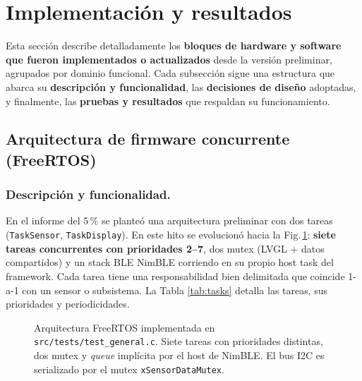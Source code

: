 \documentclass[letterpaper,11pt]{article}
\newcommand{\rfigura}[1]{Fig.\,\ref{#1}}
\newcommand{\rtabla}[1]{Tabla \ref{#1}}
\begin{document}
\section{Implementación y resultados}
\label{sec:impl}
Esta sección describe detalladamente los \textbf{bloques de hardware y software
que fueron implementados o actualizados} desde la versión preliminar, agrupados por dominio
funcional. Cada subsección sigue una estructura que abarca su \textbf{descripción y funcionalidad},
las \textbf{decisiones de diseño} adoptadas, y finalmente, las \textbf{pruebas y
resultados} que respaldan su funcionamiento.

\subsection{Arquitectura de firmware concurrente (FreeRTOS)}
\subsubsection{Descripción y funcionalidad.} En el informe del 5\,\% se planteó una arquitectura
preliminar con dos tareas (\texttt{TaskSensor}, \texttt{TaskDisplay}). En este hito se evolucionó
hacia la \rfigura{fig:rtos}: \textbf{siete tareas concurrentes con prioridades 2--7}, dos
mutex (LVGL + datos compartidos) y un stack BLE NimBLE corriendo en su propio host task del
framework. Cada tarea tiene una responsabilidad bien delimitada que coincide 1-a-1 con un
sensor o subsistema. La \rtabla{tab:tasks} detalla las tareas, sus prioridades y periodicidades.

\begin{figure}[H]
    \centering
    \resizebox{0.95\linewidth}{!}{}
    \caption{Arquitectura FreeRTOS implementada en \texttt{src/tests/test\_general.c}. Siete
    tareas con prioridades distintas, dos mutex y \textit{queue} implícita por el host de
    NimBLE. El bus I2C es serializado por el mutex \texttt{xSensorDataMutex}.}
    \label{fig:rtos}
\end{figure}
\end{document}
